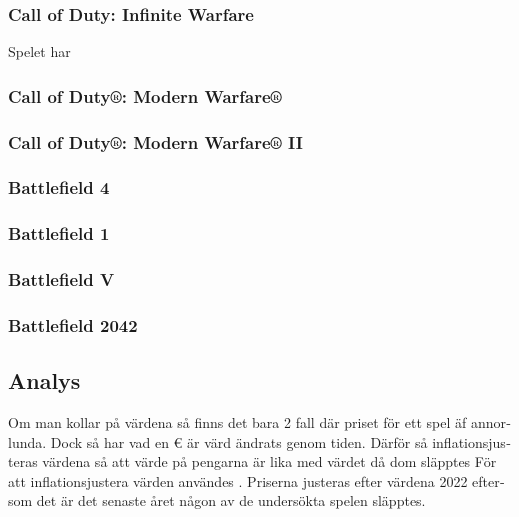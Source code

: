 \documentclass[11p]{article}
\begin{document}
\begin{otherlanguage}{swedish}
    \subsubsection{Call of Duty: Infinite Warfare}
    Spelet har


    \subsubsection{Call of Duty®: Modern Warfare®}

    \subsubsection{Call of Duty®: Modern Warfare® II}

    \subsubsection{Battlefield 4}

    \subsubsection{Battlefield 1}

    \subsubsection{Battlefield V}

    \subsubsection{Battlefield 2042}

    \subsection{Analys}
    Om man kollar på värdena så finns det bara 2 fall där priset för ett spel äf annorlunda.
    Dock så har vad en € är värd ändrats genom tiden.
    Därför så inflationsjusteras värdena så att värde på pengarna är lika med värdet då dom släpptes
    För att inflationsjustera värden användes \textcite{Inflation}.
    Priserna justeras efter värdena 2022 eftersom det är det senaste året någon av de undersökta spelen släpptes.
    \begin{table}[htbp]
        \centering
        \setlength\tabcolsep{2pt}
        \begin{tabular}{|c|c|c|}
            \hline


\end{tabular}
\end{table}
\end{otherlanguage}
\end{document}
